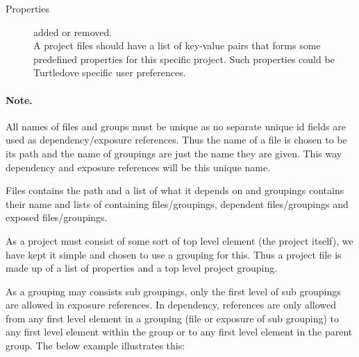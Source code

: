 \begin{description}
\item[Properties] added or removed. \\

  A project files should have a list of key-value pairs that forms some
  predefined properties for this specific project. Such properties could be
  Turtledove specific user preferences.

\end{description}

\paragraph{Note.} All names of files and groups must be unique as no separate
unique id fields are used as dependency/exposure references. Thus the name of a
file is chosen to be its path and the name of groupings are just the name they
are given. This way dependency and exposure references will be this unique name.

Files contains the path and a list of what it depends on and groupings contains
their name and lists of containing files/groupings, dependent files/groupings
and exposed files/groupings.

As a project must consist of some sort of top level element (the project
itself), we have kept it simple and chosen to use a grouping for this. Thus a
project file is made up of a list of properties and a top level project
grouping.

As a grouping may consists sub groupings, only the first level of sub groupings
are allowed in exposure references. In dependency, references are
only allowed from any first level element in a grouping (file or exposure of sub grouping)
to any first level element within the group or to any first level element in the
parent group. The below example illustrates this:

